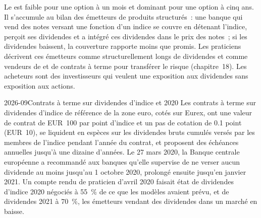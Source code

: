Le  est faible pour une option à un mois et dominant pour une option à cinq ans. Il
s'accumule au bilan des émetteurs de produits structurés~: une banque qui vend des notes
versant une fonction d'un indice se couvre en détenant l'indice, perçoit ses dividendes et
a intégré ces dividendes dans le prix des notes~; si les dividendes baissent, la couverture rapporte
moins que promis. Les praticiens décrivent ces émetteurs comme structurellement longs de dividendes et
comme vendeurs de  et de contrats à terme pour transférer le risque (chapitre~18). Les acheteurs
sont des investisseurs qui veulent une exposition aux dividendes sans exposition aux actions.

\begin{dated}{2026-09}{Contrats à terme sur dividendes d'indice et 2020}\label{dat:dv:dividends-borrow-and-forwards:divfut}
Les contrats à terme sur dividendes d'indice de référence de la zone euro, cotés sur Eurex, ont une valeur de contrat de
EUR~100 par point d'indice et un pas de cotation de 0.1 point (EUR~10), se liquident en espèces sur les
dividendes bruts cumulés versés par les membres de l'indice pendant l'année du contrat, et proposent
des échéances annuelles jusqu'à une dizaine d'années. Le 27 mars 2020, la Banque centrale européenne
a recommandé aux banques qu'elle supervise de ne verser aucun dividende au moins jusqu'au 1 octobre
2020, prolongé ensuite jusqu'en janvier 2021. Un compte rendu de praticien d'avril 2020 faisait état de
dividendes d'indice 2020 négociés à 55~\% de ce que les modèles avaient prévu, et de dividendes 2021 à
70~\%, les émetteurs vendant des dividendes dans un marché en baisse.
\end{dated}

